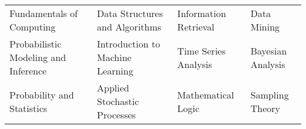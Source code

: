 {\fontsize{10.5pt}{1.3em}\bodyfont\upshape\color{text}
  \vspace{4mm}
  \begin{tabular*}{\textwidth}{l l l l}
    Fundamentals of Computing & Data Structures and Algorithms & Information Retrieval & Data Mining \\
    Probabilistic Modeling and Inference & Introduction to Machine Learning & Time Series Analysis& Bayesian Analysis\\
    Probability and Statistics & Applied Stochastic Processes & Mathematical Logic & Sampling Theory \\
\end{tabular*}
}\\\\
\vspace{-0.3cm}


